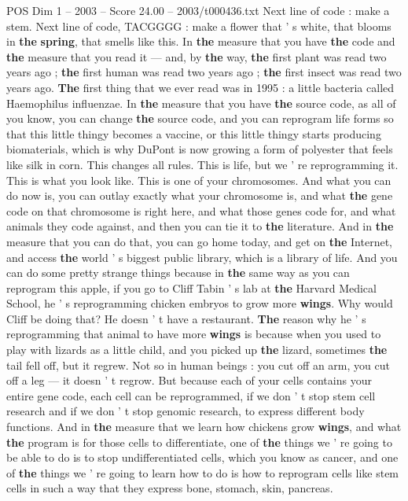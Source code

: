 \begin{textsample}{POS Dim 1 – 2003 – Score 24.00 – 2003/t000436.txt}
Next line of code : make a stem.
Next line of code, TACGGGG : make a flower that ' s white, that blooms in \textbf{the} \textbf{spring}, that smells like this.
In \textbf{the} measure that you have \textbf{the} code and \textbf{the} measure that you read it — and, by \textbf{the} way, \textbf{the} first plant was read two years ago ; \textbf{the} first human was read two years ago ; \textbf{the} first insect was read two years ago. \textbf{The} first thing that we ever read was in 1995 : a little bacteria called Haemophilus influenzae.
In \textbf{the} measure that you have \textbf{the} source code, as all of you know, you can change \textbf{the} source code, and you can reprogram life forms so that this little thingy becomes a vaccine, or this little thingy starts producing biomaterials, which is why DuPont is now growing a form of polyester that feels like silk in corn.
This changes all rules.
This is life, but we ' re reprogramming it.
This is what you look like.
This is one of your chromosomes.
And what you can do now is, you can outlay exactly what your chromosome is, and what \textbf{the} gene code on that chromosome is right here, and what those genes code for, and what animals they code against, and then you can tie it to \textbf{the} literature.
And in \textbf{the} measure that you can do that, you can go home today, and get on \textbf{the} Internet, and access \textbf{the} world ' s biggest public library, which is a library of life.
And you can do some pretty strange things because in \textbf{the} same way as you can reprogram this apple, if you go to Cliff Tabin ' s lab at \textbf{the} Harvard Medical School, he ' s reprogramming chicken embryos to grow more \textbf{wings}.
Why would Cliff be doing that?
He doesn ' t have a restaurant. \textbf{The} reason why he ' s reprogramming that animal to have more \textbf{wings} is because when you used to play with lizards as a little child, and you picked up \textbf{the} lizard, sometimes \textbf{the} tail fell off, but it regrew.
Not so in human beings : you cut off an arm, you cut off a leg — it doesn ' t regrow.
But because each of your cells contains your entire gene code, each cell can be reprogrammed, if we don ' t stop stem cell research and if we don ' t stop genomic research, to express different body functions.
And in \textbf{the} measure that we learn how chickens grow \textbf{wings}, and what \textbf{the} program is for those cells to differentiate, one of \textbf{the} things we ' re going to be able to do is to stop undifferentiated cells, which you know as cancer, and one of \textbf{the} things we ' re going to learn how to do is how to reprogram cells like stem cells in such a way that they express bone, stomach, skin, pancreas.

\end{textsample}

